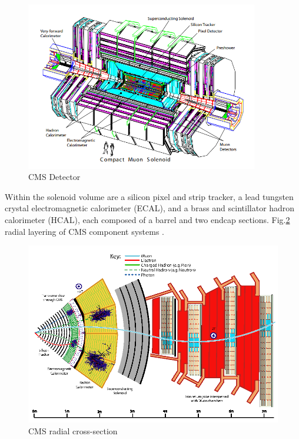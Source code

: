 \begin{figure}[h!]
\begin{centering}
\includegraphics[width=4in]{Chapter3/importfigs/fromCMS_DesignPaper_perspective.png}
\par\end{centering}
\caption{CMS Detector \cite{dEnterria:2007iyi} \label{fig:cmsCutOut}}
\end{figure}

Within the solenoid volume are a silicon pixel and strip tracker, a lead tungsten crystal electromagnetic calorimeter (ECAL), and a brass and scintillator hadron calorimeter (HCAL), each composed of a barrel and two endcap sections. Fig.\ref{fig:cmsCutOutZY} radial layering of CMS component systems \cite{10.1088/978-1-6817-4078-2ch4}.

\begin{figure}[h!]
\begin{centering}
\includegraphics[width=5.5in]{Chapter3/importfigs/Figure_001.png}
\par\end{centering}
\caption{CMS radial cross-section \cite{10.1088/978-1-6817-4078-2ch4} \label{fig:cmsCutOutZY}}
\end{figure}

